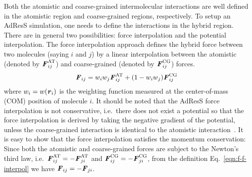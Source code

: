 \documentclass[epjST]{svjour}
\newcommand{\vect}[1]{\textbf{\textit{#1}}}
\newcommand{\AT}[0]{\textrm{AT}}
\newcommand{\CG}[0]{\textrm{CG}}
\newcommand{\moleidxone}[0]{i}
\newcommand{\moleidxtwo}[0]{j}
\begin{document}
Both the atomistic and coarse-grained intermolecular interactions are
well defined in the atomistic region and coarse-grained regions,
respectively.  To setup an AdResS simulation, one needs to define the
interactions in the hybrid region. There are in general two
possibilities: force interpolation and the potential interpolation.
The force interpolation approach defines the hybrid force between two
molecules (saying $\moleidxone$ and $\moleidxtwo$) by a linear interpolation
between the atomistic (denoted by ${\vect F}_{\moleidxone\moleidxtwo}^{\AT}$) and coarse-grained (denoted by ${\vect F}_{\moleidxone\moleidxtwo}^{\CG}$) forces.
\begin{align}\label{eqn:f-f-interpol}
  {\vect F}_{\moleidxone \moleidxtwo}=w_\moleidxone w_\moleidxtwo{\vect F}_{\moleidxone\moleidxtwo}^{\AT}+(1-w_\moleidxone w_\moleidxtwo){\vect F}^{\CG}_{\moleidxone\moleidxtwo} 
\end{align}
where $w_\moleidxone = w(\vect r_\moleidxone)$ is the weighting function
measured at the center-of-mass (COM) position of molecule $\moleidxone$.
It should be noted that the AdResS  force interpolation is not conservative, i.e.~there does not
exist a potential so that the force interpolation is derived by taking the negative gradient of the potential,
unless the coarse-grained interaction is identical to the atomistic interaction~\cite{praprotnik2011comment,dellesite2007some}.
It is easy to show that the force interpolation satisfies the momentum conservation: Since
both the atomistic and coarse-grained forces are subject to the Newton's third law, i.e.~${\vect F}_{\moleidxone\moleidxtwo}^{\AT} = - {\vect F}_{\moleidxtwo\moleidxone}^{\AT}$
and ${\vect F}_{\moleidxone\moleidxtwo}^{\CG} = - {\vect F}_{\moleidxtwo\moleidxone}^{\CG}$, from the definition Eq.~\eqref{eqn:f-f-interpol} we have ${\vect F}_{\moleidxone\moleidxtwo} = - {\vect F}_{\moleidxtwo\moleidxone}$.
\end{document}

